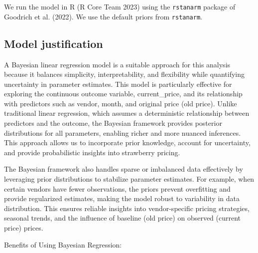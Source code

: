 \documentclass[
  letterpaper,
  DIV=11,
  numbers=noendperiod]{scrartcl}
\begin{document}
We run the model in R (R Core Team 2023) using the \texttt{rstanarm}
package of Goodrich et al. (2022). We use the default priors from
\texttt{rstanarm}.

\subsection{Model justification}\label{model-justification}

A Bayesian linear regression model is a suitable approach for this
analysis because it balances simplicity, interpretability, and
flexibility while quantifying uncertainty in parameter estimates. This
model is particularly effective for exploring the continuous outcome
variable, current\_price, and its relationship with predictors such as
vendor, month, and original price (old price). Unlike traditional linear
regression, which assumes a deterministic relationship between
predictors and the outcome, the Bayesian framework provides posterior
distributions for all parameters, enabling richer and more nuanced
inferences. This approach allows us to incorporate prior knowledge,
account for uncertainty, and provide probabilistic insights into
strawberry pricing.

The Bayesian framework also handles sparse or imbalanced data
effectively by leveraging prior distributions to stabilize parameter
estimates. For example, when certain vendors have fewer observations,
the priors prevent overfitting and provide regularized estimates, making
the model robust to variability in data distribution. This ensures
reliable insights into vendor-specific pricing strategies, seasonal
trends, and the influence of baseline (old price) on observed (current
price) prices.

Benefits of Using Bayesian Regression:
\end{document}
